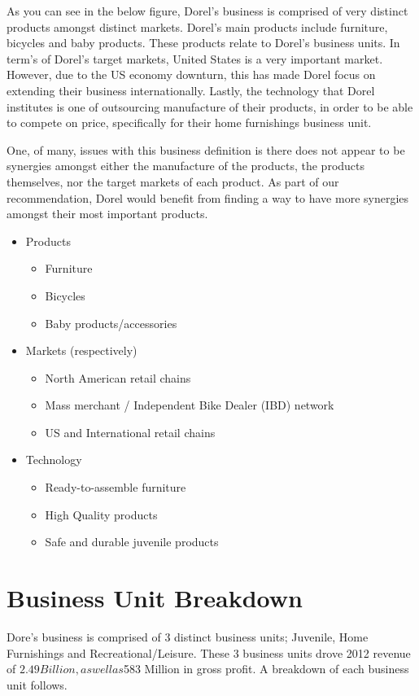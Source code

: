 As you can see in the below figure, Dorel’s business is comprised of very distinct products amongst distinct markets. Dorel’s main products include furniture, bicycles and baby products.  These products relate to Dorel’s business units.   In term’s of Dorel’s target markets, United States is a very important market. However, due to the US economy downturn, this has made Dorel focus on extending their business internationally.  Lastly, the technology that Dorel institutes is one of outsourcing manufacture of their products, in order to be able to compete on price, specifically for their home furnishings business unit.

One, of many, issues with this business definition is there does not appear to be synergies amongst either the manufacture of the products, the products themselves, nor the target markets of each product. As part of our recommendation, Dorel would benefit from finding a way to have more synergies amongst their most important products. 

\begin{itemize}        	
  \item Products
    \begin{itemize}
      \item Furniture
      \item Bicycles
      \item Baby products/accessories
    \end{itemize}
  \item Markets (respectively)
    \begin{itemize}     
      \item North American retail chains
      \item Mass merchant / Independent Bike Dealer (IBD) network
      \item US and International retail chains
    \end{itemize}
  \item Technology
    \begin{itemize}     
      \item Ready-to-assemble furniture
      \item High Quality products
      \item Safe and durable juvenile products
    \end{itemize}
\end{itemize}





\section{Business Unit Breakdown}
Dore’s business is comprised of 3 distinct business units; Juvenile, Home Furnishings and Recreational/Leisure.  These 3 business units drove 2012 revenue of $2.49 Billion, as well as $583 Million in gross profit. A breakdown of each business unit follows.

